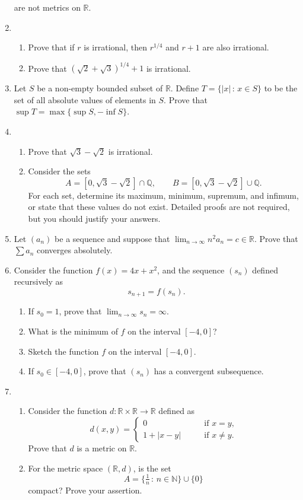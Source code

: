 \documentclass[12pt]{article}
\newcommand{\N}{\mathbb{N}}
\newcommand{\Q}{\mathbb{Q}}
\newcommand{\R}{\mathbb{R}}
\newcommand{\sep}{\,:\,}
\begin{document}
\begin{enumerate}
\[    \]
    are not metrics on $\R$.
  \item
    \begin{enumerate}
      \item Prove that if $r$ is irrational, then $r^{1/4}$ and $r+1$ are also irrational.
      \item Prove that $(\sqrt{2}+\sqrt{3})^{1/4}+1$ is irrational.
    \end{enumerate}
  \item Let $S$ be a non-empty bounded subset of $\R$. Define $T=\{|x| \sep
    x\in S\}$ to be the set of all absolute values of elements in $S$. Prove
    that $\sup T = \max\{ \sup S, -\inf S\}$.
  \item
    \begin{enumerate}
      \item Prove that $\sqrt{3}-\sqrt{2}$ is irrational.
      \item Consider the sets
        \[
          A = [0,\sqrt{3}-\sqrt{2}] \cap \Q, \qquad B = [0,\sqrt{3}-\sqrt{2}] \cup \Q.
        \]
        For each set, determine its maximum, minimum, supremum, and infimum, or
        state that these values do not exist. Detailed proofs are not required,
        but you should justify your answers.
    \end{enumerate}
  \item Let $(a_n)$ be a sequence and suppose that $\lim_{n\to\infty} n^2a_n=c
    \in \R$. Prove that $\sum a_n$ converges absolutely.
  \item Consider the function $f(x)=4x+x^2$, and the sequence
    $(s_n)$ defined recursively as
    \[
      s_{n+1} = f(s_n).
    \] 
    \begin{enumerate}
      \item If $s_0=1$, prove that $\lim_{n\to\infty} s_n = \infty$.
      \item What is the minimum of $f$ on the interval $[-4,0]$?
      \item Sketch the function $f$ on the interval $[-4,0]$.
      \item If $s_0 \in [-4,0]$, prove that $(s_n)$ has a convergent subsequence.
    \end{enumerate}
  \item
    \begin{enumerate}
      \item Consider the function $d: \R \times \R \to \R$ defined as
        \[
          d(x,y) = \begin{cases}
            0 & \qquad \text{if $x=y$,} \\
            1+|x-y| & \qquad \text{if $x\ne y$.}
          \end{cases}
        \]
        Prove that $d$ is a metric on $\R$.
      \item For the metric space $(\R,d)$, is the set
        \[
          A=\{\tfrac1n \sep n \in \N\} \cup \{0\}
        \]
        compact? Prove your assertion.
    \end{enumerate}
    
\end{enumerate}
\end{document}
